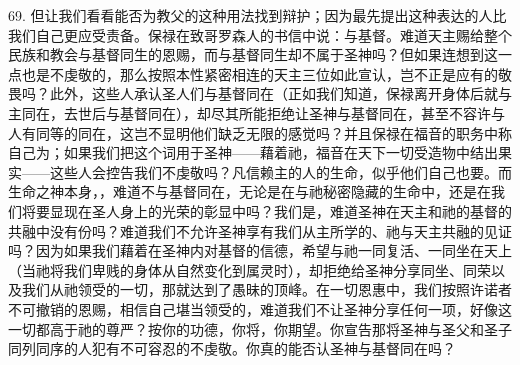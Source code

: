 \par

69. 但让我们看看能否为教父的这种用法找到辩护；因为最先提出这种表达的人比我们自己更应受责备。保禄在致哥罗森人的书信中说：与基督。难道天主赐给整个民族和教会与基督同生的恩赐，而与基督同生却不属于圣神吗？但如果连想到这一点也是不虔敬的，那么按照本性紧密相连的天主三位如此宣认，岂不正是应有的敬畏吗？此外，这些人承认圣人们与基督同在（正如我们知道，保禄离开身体后就与主同在，去世后与基督同在），却尽其所能拒绝让圣神与基督同在，甚至不容许与人有同等的同在，这岂不显明他们缺乏无限的感觉吗？并且保禄在福音的职务中称自己为；如果我们把这个词用于圣神——藉着祂，福音在天下一切受造物中结出果实——这些人会控告我们不虔敬吗？凡信赖主的人的生命，似乎他们自己也要。而生命之神本身，，难道不与基督同在，无论是在与祂秘密隐藏的生命中，还是在我们将要显现在圣人身上的光荣的彰显中吗？我们是，难道圣神在天主和祂的基督的共融中没有份吗？难道我们不允许圣神享有我们从主所学的、祂与天主共融的见证吗？因为如果我们藉着在圣神内对基督的信德，希望与祂一同复活、一同坐在天上（当祂将我们卑贱的身体从自然变化到属灵时），却拒绝给圣神分享同坐、同荣以及我们从祂领受的一切，那就达到了愚昧的顶峰。在一切恩惠中，我们按照许诺者不可撤销的恩赐，相信自己堪当领受的，难道我们不让圣神分享任何一项，好像这一切都高于祂的尊严？按你的功德，你将，你期望。你宣告那将圣神与圣父和圣子同列同序的人犯有不可容忍的不虔敬。你真的能否认圣神与基督同在吗？\par

